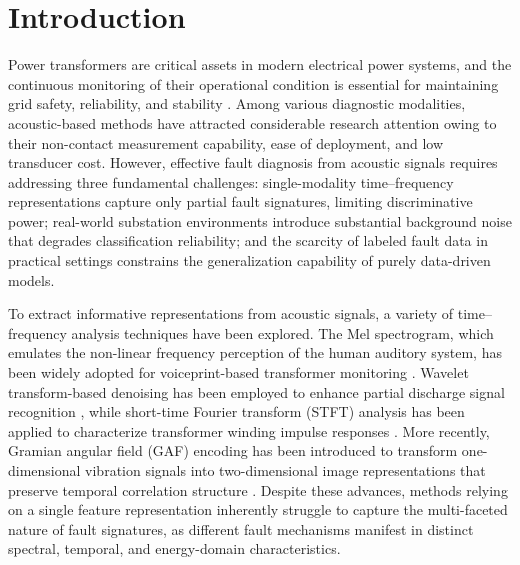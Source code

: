 \documentclass[twocolumn,iicol,pdflatex,sn-mathphys-num]{sn-jnl}%
\begin{document}
\maketitle



\section{Introduction}
Power transformers are critical assets in modern electrical power systems, and the continuous monitoring of their operational condition is essential for maintaining grid safety, reliability, and stability \cite{HE2026119781,Zhao2026}. Among various diagnostic modalities, acoustic-based methods have attracted considerable research attention owing to their non-contact measurement capability, ease of deployment, and low transducer cost. However, effective fault diagnosis from acoustic signals requires addressing three fundamental challenges: single-modality time--frequency representations capture only partial fault signatures, limiting discriminative power; real-world substation environments introduce substantial background noise that degrades classification reliability; and the scarcity of labeled fault data in practical settings constrains the generalization capability of purely data-driven models.

To extract informative representations from acoustic signals, a variety of time--frequency analysis techniques have been explored. The Mel spectrogram, which emulates the non-linear frequency perception of the human auditory system, has been widely adopted for voiceprint-based transformer monitoring \cite{a1,10606641}. Wavelet transform-based denoising has been employed to enhance partial discharge signal recognition \cite{4265659}, while short-time Fourier transform (STFT) analysis has been applied to characterize transformer winding impulse responses \cite{7558591}. More recently, Gramian angular field (GAF) encoding has been introduced to transform one-dimensional vibration signals into two-dimensional image representations that preserve temporal correlation structure \cite{9760386}. Despite these advances, methods relying on a single feature representation inherently struggle to capture the multi-faceted nature of fault signatures, as different fault mechanisms manifest in distinct spectral, temporal, and energy-domain characteristics.
\end{document}
